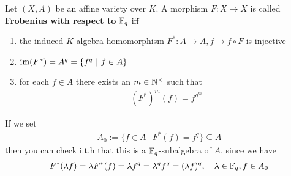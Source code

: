 \documentclass[]{article}
\begin{document}
\begin{definition}
    \label{Def:Frobenius map}
    Let \((X,A)\) be an affine variety over \(K\). A morphism \(F:X \rightarrow X\) is called \textbf{Frobenius with respect to} \({\mathbb{F}}_q\) iff
    \begin{enumerate}
        \item the induced \(K\)-algebra homomorphism \(F^*:A \rightarrow A, f \mapsto f \circ F\) is injective
        \item \(\operatorname{im}(F^*)=A^q=\{f^q\ | \ f \in A\}\)
        \item for each \(f \in A\) there exists an \(m \in {\mathbb{N}}^\times\) such that
        \begin{align*}
            (F^*)^m(f)=f^{q^m}
        \end{align*}
    \end{enumerate}
    If we set
    \begin{align*}
        A_0:=\{ f \in A \ | \ F^*(f)=f^q\} \subseteq A
    \end{align*}
    then you can check i.t.h that this is a \({\mathbb{F}}_q \)-subalgebra of \(A\), since we have
    \begin{align*}
        F^*(\lambda f)=\lambda F^*(f)=\lambda f^q = \lambda^q f^q = (\lambda f)^q, \quad \lambda \in {\mathbb{F}}_q, f \in A_0
    \end{align*}
\end{definition}
\end{document}
